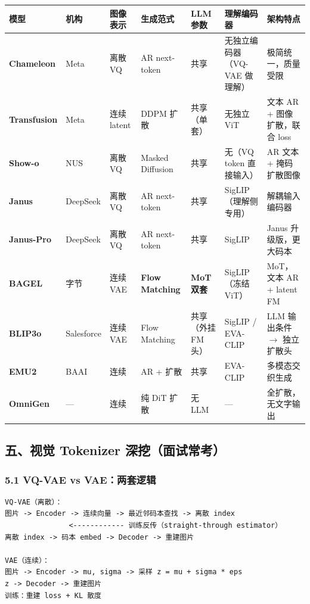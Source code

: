 \begin{table}[h]
\centering
\small
\begin{tabular}{|p{1.8cm}|p{1.5cm}|p{2cm}|p{2cm}|p{2cm}|p{2cm}|p{3cm}|}
\hline
\textbf{模型} & \textbf{机构} & \textbf{图像表示} & \textbf{生成范式} & \textbf{LLM 参数} & \textbf{理解编码器} & \textbf{架构特点} \\
\hline
\textbf{Chameleon} & Meta & 离散 VQ & AR next-token & 共享 & 无独立编码器（VQ-VAE 做理解） & 极简统一，质量受限 \\
\hline
\textbf{Transfusion} & Meta & 连续 latent & DDPM 扩散 & 共享（单套） & 无独立 ViT & 文本 AR + 图像扩散，联合 loss \\
\hline
\textbf{Show-o} & NUS & 离散 VQ & Masked Diffusion & 共享 & 无（VQ token 直接输入） & AR 文本 + 掩码扩散图像 \\
\hline
\textbf{Janus} & DeepSeek & 离散 VQ & AR next-token & 共享 & SigLIP（理解侧专用） & 解耦输入编码器 \\
\hline
\textbf{Janus-Pro} & DeepSeek & 离散 VQ & AR next-token & 共享 & SigLIP & Janus 升级版，更大码本 \\
\hline
\textbf{BAGEL} & 字节 & 连续 VAE & \textbf{Flow Matching} & \textbf{MoT 双套} & SigLIP（冻结 ViT） & MoT，文本 AR + latent FM \\
\hline
\textbf{BLIP3o} & Salesforce & 连续 VAE & Flow Matching & 共享（外挂 FM 头） & SigLIP / EVA-CLIP & LLM 输出条件 $\to$ 独立扩散头 \\
\hline
\textbf{EMU2} & BAAI & 连续 & AR + 扩散 & 共享 & EVA-CLIP & 多模态交织生成 \\
\hline
\textbf{OmniGen} & — & 连续 & 纯 DiT 扩散 & 无 LLM & — & 全扩散，无文字输出 \\
\hline
\end{tabular}
\end{table}

\subsection{五、视觉 Tokenizer 深挖（面试常考）}

\subsubsection{5.1 VQ-VAE vs VAE：两套逻辑}

\begin{lstlisting}
VQ-VAE（离散）：
图片 -> Encoder -> 连续向量 -> 最近邻码本查找 -> 离散 index
               <------------ 训练反传（straight-through estimator）
离散 index -> 码本 embed -> Decoder -> 重建图片

VAE（连续）：
图片 -> Encoder -> mu, sigma -> 采样 z = mu + sigma * eps
z -> Decoder -> 重建图片
训练：重建 loss + KL 散度
\end{lstlisting}

